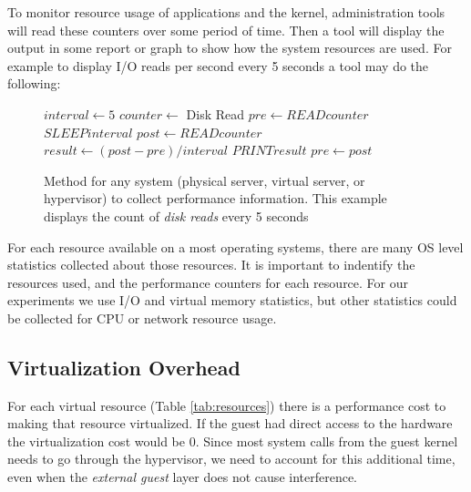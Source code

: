 \indent To monitor resource usage of applications and the kernel, administration tools will read these counters over some period of time.  
Then a tool will display the output in some report or graph to show how the system resources are used.
For example to display I/O reads per second every 5 seconds a tool may do the following:
\begin{figure}[h]
\begin{algorithmic}[H]
 \STATE $interval \gets 5$
 \STATE $counter \gets$  Disk Read
 \STATE $pre \gets READ counter$ 
 \LOOP
    \STATE $SLEEP  interval$
    \STATE $post \gets READ  counter$
    \STATE $result \gets (post - pre)/interval$
    \STATE $PRINT  result$
    \STATE $pre \gets post$ 
 \ENDLOOP
\end{algorithmic}
\caption{Method for any system (physical server, virtual server, or hypervisor) to collect performance information.  This example displays the count of \emph{disk reads} every 5 seconds}
\label{alg1}
\end{figure}

\indent For each resource available on a most operating systems, there are many OS level statistics collected about those resources.  It is important to indentify the resources used, and the performance counters for each resource.  
For our experiments we use I/O and virtual memory statistics, but other statistics could be collected for CPU or network resource usage.

\subsection{Virtualization Overhead}
For each virtual resource (Table \ref{tab:resources}) there is a performance cost to making that resource virtualized.  If the guest had direct access to the hardware the virtualization cost would be 0.  Since most system calls from the guest kernel needs to go through the hypervisor, we need to account for this additional time, even when the \emph{external guest} layer does not cause interference. 

